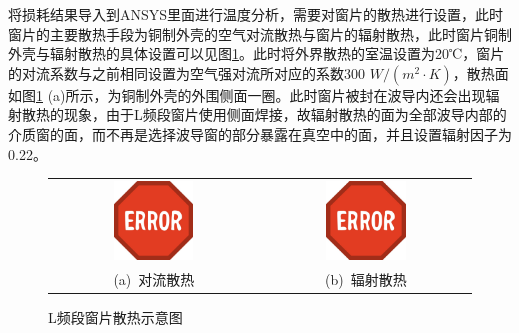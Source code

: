 \documentclass[master]{thesis-uestc}
\begin{document}
将损耗结果导入到ANSYS里面进行温度分析，需要对窗片的散热进行设置，此时窗片的主要散热手段为铜制外壳的空气对流散热与窗片的辐射散热，此时窗片铜制外壳与辐射散热的具体设置可以见图\ref{fig:L频段窗片散热示意}。此时将外界散热的室温设置为20℃，窗片的对流系数与之前相同设置为空气强对流所对应的系数300 \(W/(m^2 \cdot K)\)，散热面如图\ref{fig:L频段窗片散热示意} (a)所示，为铜制外壳的外围侧面一圈。此时窗片被封在波导内还会出现辐射散热的现象，由于L频段窗片使用侧面焊接，故辐射散热的面为全部波导内部的介质窗的面，而不再是选择波导窗的部分暴露在真空中的面，并且设置辐射因子为0.22。
\begin{figure}[!htb]
    \small
    \centering
    \begin{tabular}{@{\ }c@{\ }c}
        \includegraphics[width=0.4\textwidth]{pic/ERROR.jpg} & 
        \hspace{5pt}
        \includegraphics[width=0.4\textwidth]{pic/ERROR.jpg}     \\
        \mbox{\small (a) 对流散热}                                                                               & 
        \mbox{\small (b) 辐射散热}                                                                                  \\
    \end{tabular}
    \caption{L频段窗片散热示意图}
    \label{fig:L频段窗片散热示意}
\end{figure}
\end{document}
